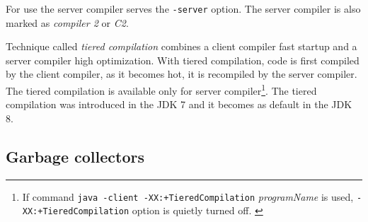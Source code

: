 \documentclass[
  digital, %
  oneside,
  notable, %
  nolof,     %
  nolot     %
]{fithesis3}
\begin{document}
For use the server compiler serves the \texttt{-server} option. The server compiler is also marked as \textit{compiler 2} or \textit{C2}.

Technique called \textit{tiered compilation} combines a client compiler fast startup and a server compiler high optimization. With tiered compilation, code is first compiled by the client compiler, as it becomes hot, it is recompiled by the server compiler. The tiered compilation is available only for server compiler\footnote{If command \texttt{java -client -XX:+TieredCompilation}\textit{ programName} is used, \texttt{-XX:+TieredCompilation} option is quietly turned off. \cite{scott}}. The tiered compilation was introduced in the JDK 7 and it becomes as default in the JDK 8. \cite{scott}
\subsection{Garbage collectors}
\end{document}
